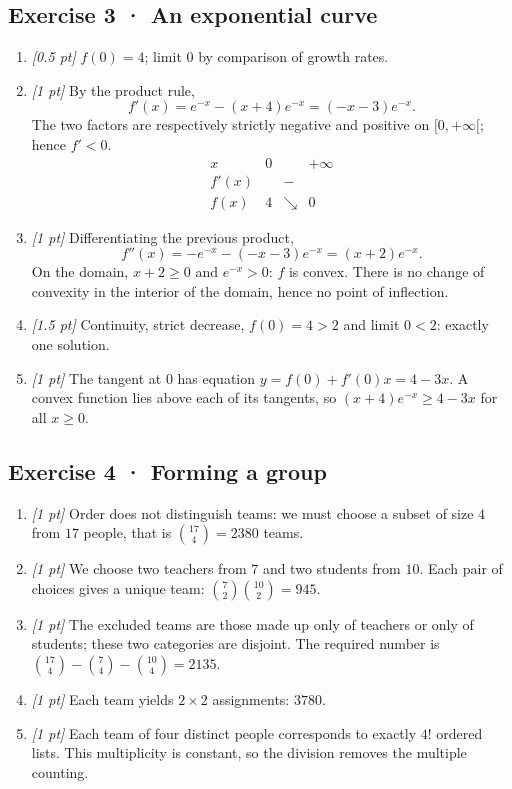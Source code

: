 \subsection*{Exercise 3 · An exponential curve}\begin{enumerate}

\item \textit{[0.5 pt]} $f(0)=4$; limit $0$ by comparison of growth rates.

\item \textit{[1 pt]} By the product rule,
\[f'(x)=e^{-x}-(x+4)e^{-x}=(-x-3)e^{-x}.\]
The two factors are respectively strictly negative and positive on $[0,+\infty[$; hence $f'<0$.
\[\begin{array}{c|ccc}x&0&&+\infty\\\hline f'(x)&&-&\\\hline f(x)&4&\searrow&0\end{array}\]

\item \textit{[1 pt]} Differentiating the previous product,
\[f''(x)=-e^{-x}-(-x-3)e^{-x}=(x+2)e^{-x}.\]
On the domain, $x+2\ge0$ and $e^{-x}>0$: $f$ is convex. There is no change of convexity in the interior of the domain, hence no point of inflection.

\item \textit{[1.5 pt]} Continuity, strict decrease, $f(0)=4>2$ and limit $0<2$: exactly one solution.

\item \textit{[1 pt]} The tangent at $0$ has equation $y=f(0)+f'(0)x=4-3x$. A convex function lies above each of its tangents, so $(x+4)e^{-x}\ge 4-3x$ for all $x\ge0$.

\end{enumerate}

\subsection*{Exercise 4 · Forming a group}\begin{enumerate}

\item \textit{[1 pt]} Order does not distinguish teams: we must choose a subset of size $4$ from $17$ people, that is $\binom{17}4=2380$ teams.

\item \textit{[1 pt]} We choose two teachers from $7$ and two students from $10$. Each pair of choices gives a unique team: $\binom{7}2\binom{10}2=945$.

\item \textit{[1 pt]} The excluded teams are those made up only of teachers or only of students; these two categories are disjoint. The required number is $\binom{17}4-\binom{7}4-\binom{10}4=2135$.

\item \textit{[1 pt]} Each team yields $2\times2$ assignments: $3780$.

\item \textit{[1 pt]} Each team of four distinct people corresponds to exactly $4!$ ordered lists. This multiplicity is constant, so the division removes the multiple counting.

\end{enumerate}

\fi

\fi


